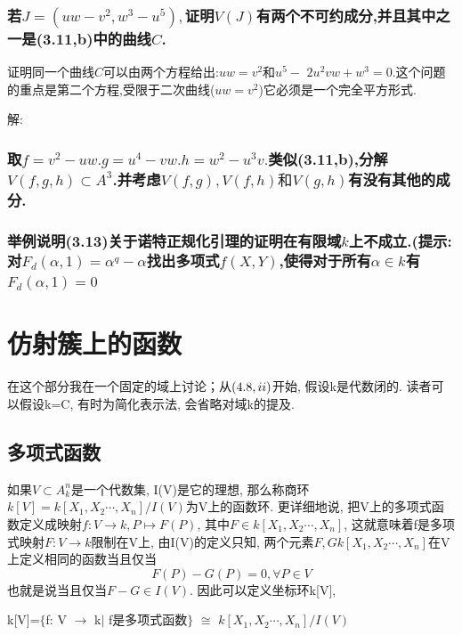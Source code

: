 \documentclass[UTF8]{book}
\begin{document}
			
			
		\subsection{若$J =\left( uw - v ^{2}, w ^{3}- u ^{5}\right),$证明$V ( J )$有两个不可约成分,并且其中之一是(3.11,b)中的曲线$ C $.}
		证明同一个曲线$ C $可以由两个方程给出:$u w=v^{2}$和$u^{5}-$ $2 u^{2} v w+w^{3}=0 .$这个问题的重点是第二个方程,受限于二次曲线($u w=v^{2}$)它必须是一个完全平方形式.
		
		
			解:
		
		\subsection{取$f=v^{2}-u w . g=u^{4}-v w . h=w^{2}-u^{3} v .$类似(3.11,b),分解$V(f, g, h) \subset A^{3}$.并考虑$V(f, g), V(f, h) \text {和} V(g, h)$有没有其他的成分.}
		
		
		\subsection{举例说明(3.13)关于诺特正规化引理的证明在有限域$ k $上不成立.(提示:对$ F_{d}(\alpha,1) = \alpha^{q}-\alpha$找出多项式$ f(X,Y) $,使得对于所有$ \alpha \in k $有$ F_{d}(\alpha,1)=0 $}
		
		
\chapter{仿射簇上的函数}
	\indent 在这个部分我在一个固定的域上讨论；从$(4.8, \romannumeral2)$开始, 假设k是代数闭的. 读者可以假设k=C, 有时为简化表示法, 会省略对域k的提及.

		\section{多项式函数} 如果$V\subset A^{n}_{k}$是一个代数集, I(V)是它的理想, 那么称商环$k[V]=k[X_{1},X_{2}\cdots,X_{n}]/I(V)$为V上的函数环. 更详细地说, 把V上的多项式函数定义成映射$f:V\rightarrow k, P\mapsto F(P)$, 其中$F\in k[X_{1},X_{2}\cdots,X_{n}]$, 这就意味着f是多项式映射$F:V\rightarrow k$限制在V上, 由I(V)的定义只知, 两个元素$F,G k[X_{1},X_{2}\cdots,X_{n}]$在V上定义相同的函数当且仅当
		\begin{equation*}
		F(P)-G(P)=0, \forall  P\in V
		\end{equation*}
		也就是说当且仅当$F-G\in I(V)$. 因此可以定义坐标环k[V],

				\center  k[V]=$\{$f: V  $\rightarrow$  k$\vert$ f是多项式函数$\}$ $\cong $ $k[X_{1},X_{2}\cdots,X_{n}]/I(V)$
\end{document}
